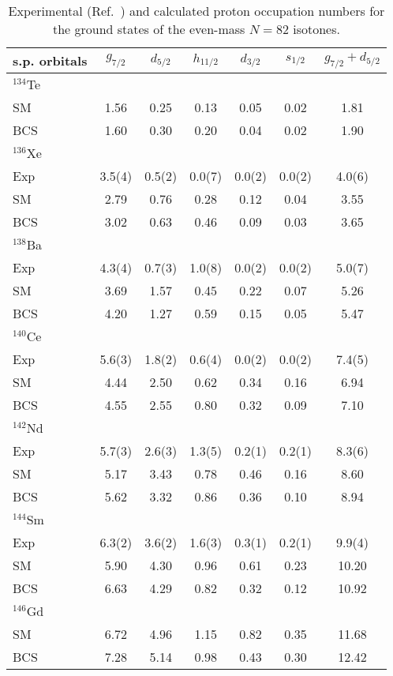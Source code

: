 \begin{table}[htbp]
\begin{center}
\caption{Experimental (Ref.\ \protect \cite{wna71}) and calculated proton occupation 
numbers for the ground states of the even-mass $N=82$ isotones.}
\begin{tabular}{lcccccc}
\hline
s.p. orbitals & $g_{7/2}$ & $d_{5/2}$ & $h_{11/2}$ & $d_{3/2}$ & $s_{1/2}$ & 
            $g_{7/2} + d_{5/2}$ \\
\hline
$^{134}$Te & & & & & & \\
SM         & 1.56   & 0.25   & 0.13   & 0.05   & 0.02   & 1.81 \\
BCS        & 1.60   & 0.30   & 0.20   & 0.04   & 0.02   & 1.90 \\
$^{136}$Xe & & & & & & \\
Exp        & 3.5(4) & 0.5(2) & 0.0(7) & 0.0(2) & 0.0(2) & 4.0(6) \\
SM         & 2.79   & 0.76   & 0.28   & 0.12   & 0.04   & 3.55 \\ 
BCS        & 3.02   & 0.63   & 0.46   & 0.09   & 0.03   & 3.65 \\
$^{138}$Ba & & & & & & \\
Exp        & 4.3(4) & 0.7(3) & 1.0(8) & 0.0(2) & 0.0(2) & 5.0(7) \\
SM         & 3.69   & 1.57   & 0.45   & 0.22   & 0.07   & 5.26 \\
BCS        & 4.20   & 1.27   & 0.59   & 0.15   & 0.05   & 5.47 \\
$^{140}$Ce & & & & & & \\
Exp        & 5.6(3) & 1.8(2) & 0.6(4) & 0.0(2) & 0.0(2) & 7.4(5) \\
SM         & 4.44   & 2.50   & 0.62   & 0.34   & 0.16   & 6.94 \\
BCS        & 4.55   & 2.55   & 0.80   & 0.32   & 0.09   & 7.10 \\
$^{142}$Nd & & & & & & \\
Exp        & 5.7(3) & 2.6(3) & 1.3(5) & 0.2(1) & 0.2(1) & 8.3(6) \\
SM         & 5.17   & 3.43   & 0.78   & 0.46   & 0.16   & 8.60 \\
BCS        & 5.62   & 3.32   & 0.86   & 0.36   & 0.10   & 8.94 \\
$^{144}$Sm & & & & & & \\
Exp        & 6.3(2) & 3.6(2) & 1.6(3) & 0.3(1) & 0.2(1) & 9.9(4) \\
SM         & 5.90   & 4.30   & 0.96   & 0.61   & 0.23   & 10.20  \\
BCS        & 6.63   & 4.29   & 0.82   & 0.32   & 0.12   & 10.92 \\
$^{146}$Gd & & & & & & \\
SM         & 6.72   &   4.96 & 1.15   & 0.82   & 0.35   & 11.68 \\
BCS        & 7.28   & 5.14   & 0.98   & 0.43   & 0.30   & 12.42 \\
\hline
\end{tabular}
\label{tab:occupation}
\end{center}
\end{table}

